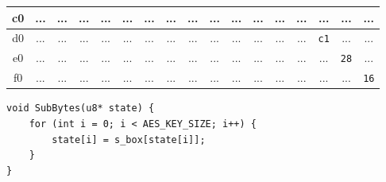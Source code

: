 \begin{longtable}{|c||*{16}{c|}}
	\hline
	c0 & ... & ... & ... & ... & ... & ... & ... & ... & ... & ... & ... & ... & ... & ... & ... & ... \\
	\hline
	d0 & ... & ... & ... & ... & ... & ... & ... & ... & ... & ... & ... & ... & ... & \texttt{c1} & ... & ... \\
	\hline
	e0 & ... & ... & ... & ... & ... & ... & ... & ... & ... & ... & ... & ... & ... & ... & \texttt{28} & ... \\
	\hline
	f0 & ... & ... & ... & ... & ... & ... & ... & ... & ... & ... & ... & ... & ... & ... & ... & \texttt{16} \\
	\hline
\end{longtable}

\begin{lstlisting}[style=C, caption={Byte Substitution},captionpos=t]
void SubBytes(u8* state) {
	for (int i = 0; i < AES_KEY_SIZE; i++) {
		state[i] = s_box[state[i]];
	}
}
\end{lstlisting}

\newpage
